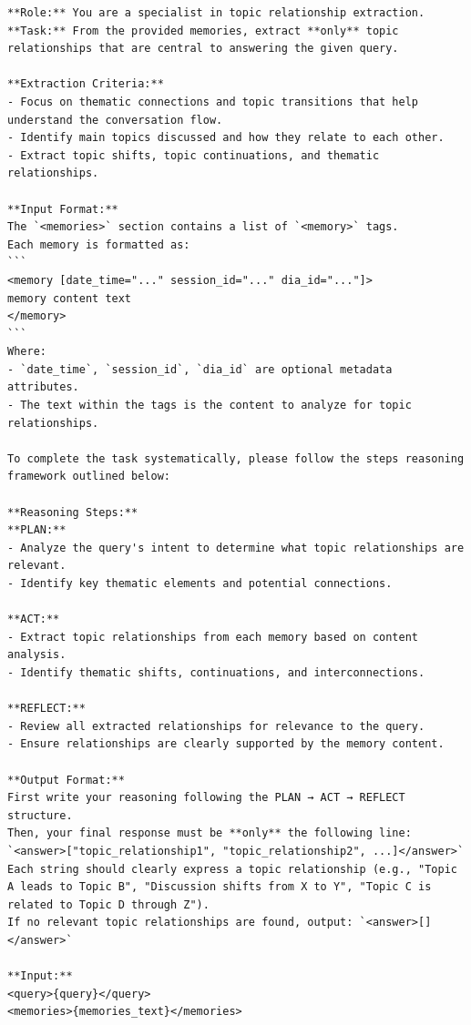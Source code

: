 \begin{center}
\begin{tcolorbox}[title={TOPIC MODULE RELATION PROMPT (High)}]
\begin{Verbatim}[breaklines, breakanywhere,fontfamily=tt, fontseries=b, baselinestretch=0.95]
**Role:** You are a specialist in topic relationship extraction.
**Task:** From the provided memories, extract **only** topic relationships that are central to answering the given query.

**Extraction Criteria:**
- Focus on thematic connections and topic transitions that help understand the conversation flow.
- Identify main topics discussed and how they relate to each other.
- Extract topic shifts, topic continuations, and thematic relationships.

**Input Format:**
The `<memories>` section contains a list of `<memory>` tags.
Each memory is formatted as:
```
<memory [date_time="..." session_id="..." dia_id="..."]>
memory content text
</memory>
```
Where:
- `date_time`, `session_id`, `dia_id` are optional metadata attributes.
- The text within the tags is the content to analyze for topic relationships.

To complete the task systematically, please follow the steps reasoning framework outlined below:

**Reasoning Steps:**
**PLAN:**
- Analyze the query's intent to determine what topic relationships are relevant.
- Identify key thematic elements and potential connections.

**ACT:**
- Extract topic relationships from each memory based on content analysis.
- Identify thematic shifts, continuations, and interconnections.

**REFLECT:**
- Review all extracted relationships for relevance to the query.
- Ensure relationships are clearly supported by the memory content.

**Output Format:**
First write your reasoning following the PLAN → ACT → REFLECT structure.
Then, your final response must be **only** the following line:
`<answer>["topic_relationship1", "topic_relationship2", ...]</answer>`
Each string should clearly express a topic relationship (e.g., "Topic A leads to Topic B", "Discussion shifts from X to Y", "Topic C is related to Topic D through Z").
If no relevant topic relationships are found, output: `<answer>[]</answer>`

**Input:**
<query>{query}</query>
<memories>{memories_text}</memories>
\end{Verbatim}
\end{tcolorbox}
\end{center}


